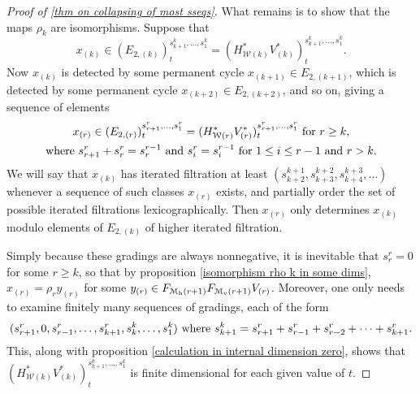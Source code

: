 \documentclass[11pt]{amsart}
\theoremstyle{plain}
\theoremstyle{definition}
\newcommand{\calW}{\mathcal{W}}
\newcommand{\calM}{\mathcal{M}}
\theoremstyle{plain}
\begin{document}
\begin{Calculations of HWn for n nonzero}
\begin{proof}[Proof of \ref{thm on collapsing of most sseqs}]
What remains is to show that the maps $\rho_k$ are isomorphisms. Suppose that 
\[x_{(k)}\in (E_{2,(k)})^{s_{k+1}^{k},\ldots,s_1^{k}}_t=(H^*_{\calW(k)}V^*_{(k)})^{s_{k+1}^{k},\ldots,s_1^{k}}_t.\]
Now $x_{(k)}$ is detected by some permanent cycle $x_{(k+1)}\in E_{2,(k+1)}$, which is detected by some permanent cycle $x_{(k+2)}\in E_{2,(k+2)}$, and so on, giving a sequence of elements
\begin{gather*}
x_{(r)}\in (E_{2,(r)})^{s_{r+1}^{r},\ldots,s_1^{r}}_t=(H^*_{\calW(r)}V^*_{(r)})^{s_{r+1}^{r},\ldots,s_1^{r}}_t\textup{ for $r\geq k$,}\\
\textup{where }s^{r}_{r+1}+s^{r}_{r}=s^{r-1}_{r}\textup{ and }s^{r}_{i}=s^{r-1}_{i}\textup{  for $1\leq i\leq r-1$ and $r>k$}.
\end{gather*}
We will say that $x_{(k)}$ has iterated filtration at least $(s^{k+1}_{k+2},s^{k+2}_{k+3},s^{k+3}_{k+4},\ldots)$ whenever a sequence of such classes $x_{(r)}$ exists, and partially order the set of possible iterated filtrations lexicographically. Then $x_{(r)}$ only determines $x_{(k)}$ modulo elements of $E_{2,(k)}$ of higher iterated filtration.

Simply because these gradings are always nonnegative, it is inevitable that $s_r^r=0$ for some $r\geq k$, so that by proposition \ref{isomorphism rho k in some dims}, $x_{(r)}=\rho_ry_{(r)}$ for some $y_{(r)}\in F_{\calM_{\textup{h}}(r+1)}F_{\calM_{\textup{v}}(r+1)}V_{(r)}$. Moreover, one only needs to examine finitely many sequences of gradings, each of the form
\[(s^r_{r+1},0,s^{r}_{r-1},\ldots, s^{r}_{k+1},s^k_{k},\ldots,s^k_1)\textup{ where }s^k_{k+1}=s^r_{r+1}+s^{r}_{r-1}+s^{r}_{r-2}+\cdots +s^{r}_{k+1}.\]
This, along with proposition \ref{calculation in internal dimension zero}, shows that $(H^*_{\calW(k)}V^*_{(k)})^{s_{k+1}^{k},\ldots,s_1^{k}}_t$ is finite dimensional for each given value of $t$.




\end{proof}
\end{Calculations of HWn for n nonzero}
\end{document}
